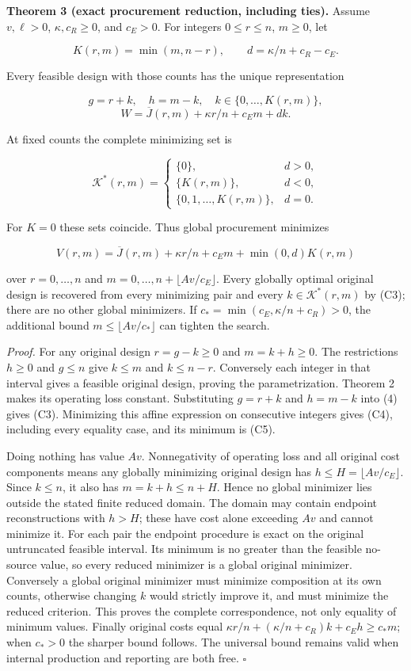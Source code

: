 \documentclass[
  11pt,
]{article}
\begin{document}
\textbf{Theorem 3 (exact procurement reduction, including ties).} Assume
\(v,\ell>0\), \(\kappa,c_R\geq0\), and \(c_E>0\). For integers
\(0\leq r\leq n\), \(m\geq0\), let

\[K(r,m)=\min(m,n-r),\qquad d=\kappa/n+c_R-c_E. \tag{C2}\]

Every feasible design with those counts has the unique representation

\[g=r+k,\quad h=m-k,\quad k\in\{0,\ldots,K(r,m)\},\]
\[W=\overline J(r,m)+\kappa r/n+c_E m+dk. \tag{C3}\]

At fixed counts the complete minimizing set is

\[\mathcal K^*(r,m)=
\begin{cases}
\{0\},&d>0,\\
\{K(r,m)\},&d<0,\\
\{0,1,\ldots,K(r,m)\},&d=0.
\end{cases} \tag{C4}\]

For \(K=0\) these sets coincide. Thus global procurement minimizes

\[V(r,m)=\overline J(r,m)+\kappa r/n+c_E m
+\min(0,d)K(r,m) \tag{C5}\]

over \(r=0,\ldots,n\) and \(m=0,\ldots,n+\lfloor Av/c_E\rfloor\). Every
globally optimal original design is recovered from every minimizing pair
and every \(k\in\mathcal K^*(r,m)\) by (C3); there are no other global
minimizers. If \(c_* =\min(c_E,\kappa/n+c_R)>0\), the additional bound
\(m\leq\lfloor Av/c_*\rfloor\) can tighten the search.

\emph{Proof.} For any original design \(r=g-k\geq0\) and \(m=k+h\geq0\).
The restrictions \(h\geq0\) and \(g\leq n\) give \(k\leq m\) and
\(k\leq n-r\). Conversely each integer in that interval gives a feasible
original design, proving the parametrization. Theorem 2 makes its
operating loss constant. Substituting \(g=r+k\) and \(h=m-k\) into (4)
gives (C3). Minimizing this affine expression on consecutive integers
gives (C4), including every equality case, and its minimum is (C5).

Doing nothing has value \(Av\). Nonnegativity of operating loss and all
original cost components means any globally minimizing original design
has \(h\leq H=\lfloor Av/c_E\rfloor\). Since \(k\leq n\), it also has
\(m=k+h\leq n+H\). Hence no global minimizer lies outside the stated
finite reduced domain. The domain may contain endpoint reconstructions
with \(h>H\); these have cost alone exceeding \(Av\) and cannot minimize
it. For each pair the endpoint procedure is exact on the original
untruncated feasible interval. Its minimum is no greater than the
feasible no-source value, so every reduced minimizer is a global
original minimizer. Conversely a global original minimizer must minimize
composition at its own counts, otherwise changing \(k\) would strictly
improve it, and must minimize the reduced criterion. This proves the
complete correspondence, not only equality of minimum values. Finally
original costs equal \(\kappa r/n+(\kappa/n+c_R)k+c_Eh\geq c_*m\); when
\(c_*>0\) the sharper bound follows. The universal bound remains valid
when internal production and reporting are both free. \(\square\)
\end{document}
